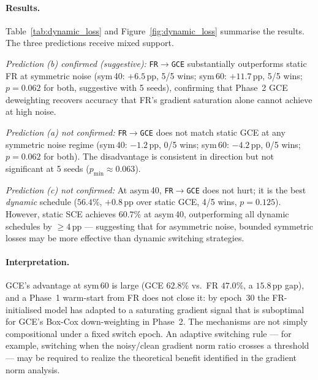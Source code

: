 \documentclass[11pt]{article}
\begin{document}
\paragraph{Results.}
Table~\ref{tab:dynamic_loss} and Figure~\ref{fig:dynamic_loss} summarise the results.
The three predictions receive mixed support.

\emph{Prediction (b) confirmed (suggestive):}
\texttt{FR$\to$GCE} substantially outperforms static FR at symmetric noise
(sym\,40: $+6.5$\,pp, 5/5 wins; sym\,60: $+11.7$\,pp, 5/5 wins; $p=0.062$ for both,
suggestive with 5 seeds), confirming that Phase~2 GCE deweighting recovers accuracy
that FR's gradient saturation alone cannot achieve at high noise.

\emph{Prediction (a) not confirmed:}
\texttt{FR$\to$GCE} does not match static GCE at any symmetric noise regime
(sym\,40: $-1.2$\,pp, 0/5 wins; sym\,60: $-4.2$\,pp, 0/5 wins; $p=0.062$ for both).
The disadvantage is consistent in direction but not significant at 5 seeds
($p_{\min}\approx0.063$).

\emph{Prediction (c) not confirmed:}
At asym\,40, \texttt{FR$\to$GCE} does not hurt; it is the best \emph{dynamic}
schedule ($56.4\%$, $+0.8$\,pp over static GCE, 4/5 wins, $p=0.125$).
However, static SCE achieves $60.7\%$ at asym\,40, outperforming all dynamic
schedules by $\geq 4$\,pp — suggesting that for asymmetric noise,
bounded symmetric losses may be more effective than dynamic switching strategies.

\paragraph{Interpretation.}
GCE's advantage at sym\,60 is large (GCE $62.8\%$ vs.\ FR $47.0\%$, a $15.8$\,pp gap),
and a Phase~1 warm-start from FR does not close it: by epoch~30 the FR-initialised
model has adapted to a saturating gradient signal that is suboptimal for GCE's
Box-Cox down-weighting in Phase~2.
The mechanisms are not simply compositional under a fixed switch epoch.
An adaptive switching rule --- for example, switching when the noisy/clean gradient
norm ratio crosses a threshold --- may be required to realize the theoretical
benefit identified in the gradient norm analysis.
\end{document}
